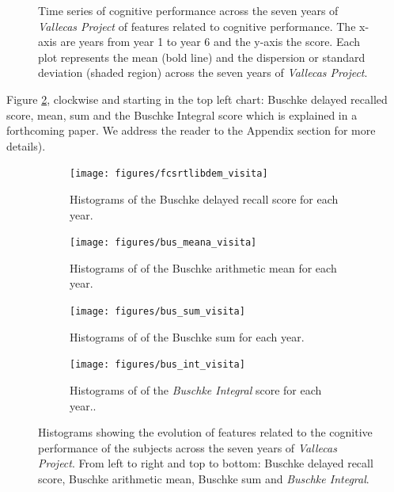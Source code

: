\documentclass[11pt]{article}
\theoremstyle{definition}
\theoremstyle{remark}
\begin{document}
\begin{figure}[H]
    \caption{Time series of cognitive performance across the seven years of \emph{Vallecas Project} of features related to cognitive performance. The x-axis are years from year 1 to year 6 and the y-axis the score. Each plot represents the mean (bold line) and the dispersion or standard deviation (shaded region) across the seven years of \emph{Vallecas Project}.}
    \label{fig:cogper4}
\end{figure}

Figure \ref{fig:cogperyearsbus}, clockwise and starting in the top left chart: Buschke delayed recalled score, mean, sum and the Buschke Integral score which is explained in a forthcoming paper. We address the reader to the Appendix section for more details).

\begin{figure}[H]
    \centering
    \begin{subfigure}[t]{0.4\textwidth}
        \centering
        \texttt{[image: figures/fcsrtlibdem\_visita]}
        \caption{Histograms of the Buschke delayed recall score for each year.}
    \end{subfigure}
    \hfill
    \begin{subfigure}[t]{0.4\textwidth}
        \centering
        \texttt{[image: figures/bus\_meana\_visita]}
        \caption{Histograms of of the Buschke arithmetic mean for each year.}
    \end{subfigure}%
    
     \begin{subfigure}[t]{0.4\textwidth}
        \centering
        \texttt{[image: figures/bus\_sum\_visita]}
        \caption{Histograms of of the Buschke sum for each year.}
    \end{subfigure}
    \hfill
    \begin{subfigure}[t]{0.4\textwidth}
        \centering
        \texttt{[image: figures/bus\_int\_visita]}
        \caption{Histograms of of the \emph{Buschke Integral} score for each year..}
    \end{subfigure}%
   
    \caption{Histograms showing the evolution of features related to the cognitive performance of the subjects across the seven years of \emph{Vallecas Project}. From left to right and top to bottom: 
    Buschke delayed recall score, Buschke arithmetic mean, Buschke sum and \emph{Buschke Integral}.}
    \label{fig:cogperyearsbus}
\end{figure}
\end{document}
